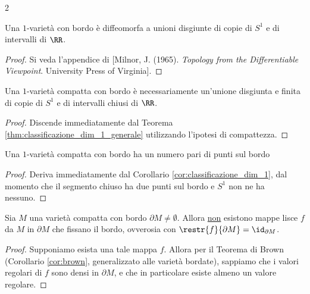 \begin{multicols*}{2}
    \begin{theorem} \label{thm:classificazione_dim_1_generale}
        Una $1$-varietà con bordo è diffeomorfa a unioni disgiunte di copie di $S^1$ e
        di intervalli di $\RR$.
    \end{theorem}

    \begin{proof}
        Si veda l'appendice di [Milnor, J. (1965). \textit{Topology from the Differentiable Viewpoint}. University Press of Virginia].
    \end{proof}

    \begin{corollary} \label{cor:classificazione_dim_1}
        Una $1$-varietà compatta con bordo è necessariamente un'unione disgiunta e finita
        di copie di $S^1$ e di intervalli chiusi di $\RR$.
    \end{corollary}

    \begin{proof}
        Discende immediatamente dal Teorema \ref{thm:classificazione_dim_1_generale}
        utilizzando l'ipotesi di compattezza.
    \end{proof}

    \begin{corollary} \label{cor:punti_pari_su_1varietà}
        Una $1$-varietà compatta con bordo ha un numero pari di punti sul bordo
    \end{corollary}

    \begin{proof}
        Deriva immediatamente dal Corollario \ref{cor:classificazione_dim_1}, dal momento che
        il segmento chiuso ha due punti sul bordo e $S^1$ non ne ha nessuno.
    \end{proof}

    \begin{lemma} \label{lem:non_retrazione}
        Sia $M$ una varietà compatta con bordo $\partial M \neq \emptyset$. Allora \underline{non}
        esistono mappe lisce $f$ da $M$ in $\partial M$ che fissano il bordo, ovverosia
        con $\restr{f}{\partial M} = \id_{\partial M}$.
    \end{lemma}

    \begin{proof}
        Supponiamo esista una tale mappa $f$. Allora per il Teorema di Brown (Corollario \ref{cor:brown}, generalizzato alle varietà
        bordate), sappiamo che i valori regolari di $f$ sono densi in $\partial M$, e che in particolare
        esiste almeno un valore regolare. \smallskip


\end{proof}
\end{multicols*}
